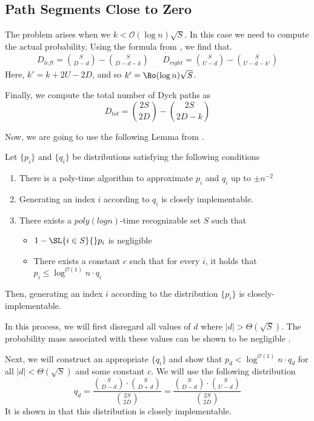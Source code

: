 \subsection{Path Segments Close to Zero}
The problem arises when we $k <\mathcal{O}(\log n)\sqrt{S}$. In this case we need to compute the actual probability,
Using the formula from \cite{trap}, we find that.
\begin{align}
D_{left} = {{S}\choose{D-d}}-{{S}\choose{D-d-k}} &&D_{right} = {{S}\choose{U-d}}-{{S}\choose{U-d-k'}}
\end{align}
Here, $k' = k+2U-2D$, and so $k' = \Bo(\log n)\sqrt S$.

Finally, we compute the total number of Dyck paths as
$$
D_{tot} = {{2S}\choose{2D}}-{{2S}\choose{2D-k}}
$$

Now, we are going to use the following Lemma from \cite{huge}.
\begin{lemma}
\label{lem:huge}
Let $\{p_i\}$ and $\{q_i\}$ be distributions satisfying the following conditions
\begin{enumerate}
    \item There is a poly-time algorithm to approximate $p_i$ and $q_i$ up to $\pm n^{-2}$
    \item Generating an index $i$ according to $q_i$ is closely implementable.
    \item There exists a $poly(log n)$-time recognizable set $S$ such that
    \begin{itemize}
        \item $1-\SL{i\in S}{} p_i$ is negligible
        \item There exists a constant $c$ such that for every $i$, it holds that $p_i\le \log^{\mathcal{O}(1)} n\cdot q_i$
    \end{itemize}
\end{enumerate}
Then, generating an index $i$ according to the distribution $\{p_i\}$ is closely-implementable.
\end{lemma}

In this process, we will first disregard all values of $d$ where $|d|>\Theta(\sqrt S)$.
The probability mass associated with these values can be shown to be negligible .

Next, we will construct an appropriate $\{q_i\}$ and show that $p_d < \log^{\mathcal{O}(1)} n\cdot q_d$
for all $|d|<\Theta(\sqrt S)$ and some constant $c$.
We will use the following distribution
$$
q_d = \frac{{S\choose D-d}\cdot{S\choose D+d}}{{2S\choose 2D}} = \frac{{S\choose D-d}\cdot{S\choose U-d}}{{2S\choose 2D}}
$$
It is shown in \cite{huge} that this distribution is closely implementable.

